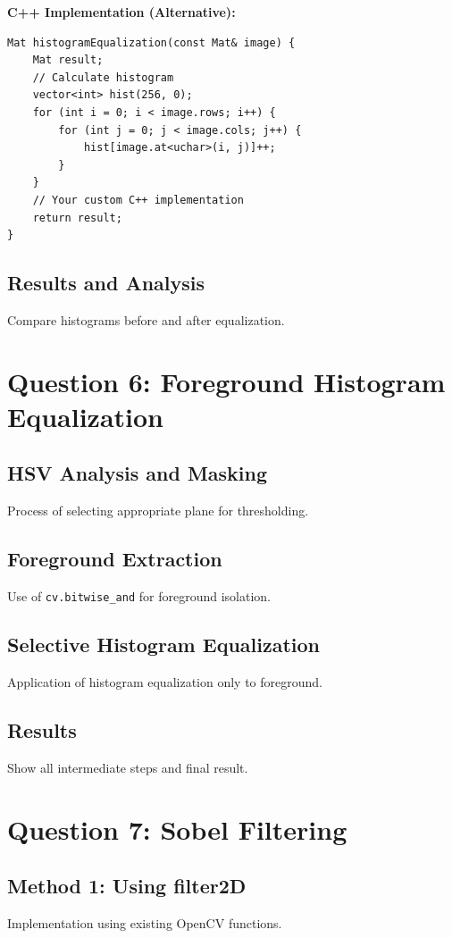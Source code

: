\documentclass[12pt]{article}
\begin{document}
\textbf{C++ Implementation (Alternative):}
\begin{lstlisting}[style=cppstyle]
Mat histogramEqualization(const Mat& image) {
    Mat result;
    // Calculate histogram
    vector<int> hist(256, 0);
    for (int i = 0; i < image.rows; i++) {
        for (int j = 0; j < image.cols; j++) {
            hist[image.at<uchar>(i, j)]++;
        }
    }
    // Your custom C++ implementation
    return result;
}
\end{lstlisting}

\subsection{Results and Analysis}
Compare histograms before and after equalization.

\section{Question 6: Foreground Histogram Equalization}
\subsection{HSV Analysis and Masking}
Process of selecting appropriate plane for thresholding.

\subsection{Foreground Extraction}
Use of \texttt{cv.bitwise\_and} for foreground isolation.

\subsection{Selective Histogram Equalization}
Application of histogram equalization only to foreground.

\subsection{Results}
Show all intermediate steps and final result.

\section{Question 7: Sobel Filtering}
\subsection{Method 1: Using filter2D}
Implementation using existing OpenCV functions.
\end{document}
